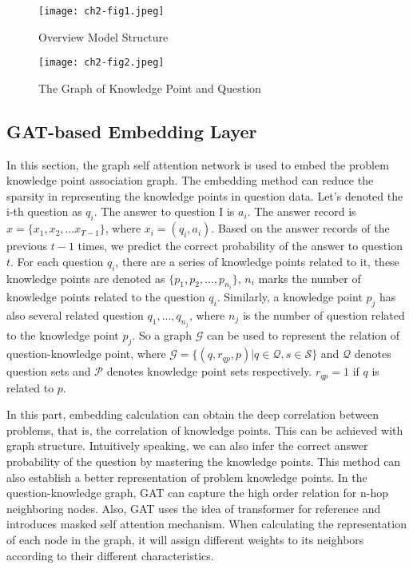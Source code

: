 \begin{figure}[h]
	\centering
	\texttt{[image: ch2-fig1.jpeg]}
	\caption{Overview Model Structure}
	\label{fig1}
\end{figure}
\begin{figure}[h]
	\centering
	\texttt{[image: ch2-fig2.jpeg]}
	\caption{The Graph of Knowledge Point and Question}
	\label{fig2}
\end{figure}


\subsection{GAT-based Embedding Layer}

In this section, the graph self attention network is used to embed the problem knowledge point association graph. The embedding method can reduce the sparsity in representing the knowledge points in question data. Let's denoted the i-th question as $q_i$. The answer to question I is $a_i$. The answer record is $x = \{x_1,x_2,...x_{T-1}\}$, where $x_i=(q_i,a_i)$. Based on the answer records of the previous $t-1$ times, we predict the correct probability of the answer to question $t$. For each question $q_i$, there are a series of knowledge points related to it, these knowledge points are denoted as $\{p_1,p_2,...,p_{n_i}\}$, $n_i$ marks the number of knowledge points related to the question $q_i$. Similarly, a knowledge point $p_j$ has also several related question $q_1,...,q_{n_j}$, where $n_j$ is the number of question related to the knowledge point $p_j$. So a graph $\mathcal{G}$ can be used to represent the relation of question-knowledge point, where $\mathcal{G}=\{(q, r_{qp}, p) | q \in \mathcal{Q}, s \in \mathcal{S}\}$ and $\mathcal{Q}$ denotes question sets and $\mathcal{P}$ denotes knowledge point sets respectively. $r_{qp}=1$ if $q$ is related to $p$.

In this part, embedding calculation can obtain the deep correlation between problems, that is, the correlation of knowledge points. This can be achieved with graph structure. Intuitively speaking, we can also infer the correct answer probability of the question by mastering the knowledge points. This method can also establish a better representation of problem knowledge points. In the question-knowledge graph, GAT can capture the high order relation for n-hop neighboring nodes. Also, GAT uses the idea of transformer for reference and introduces masked self attention mechanism. When calculating the representation of each node in the graph, it will assign different weights to its neighbors according to their different characteristics.

